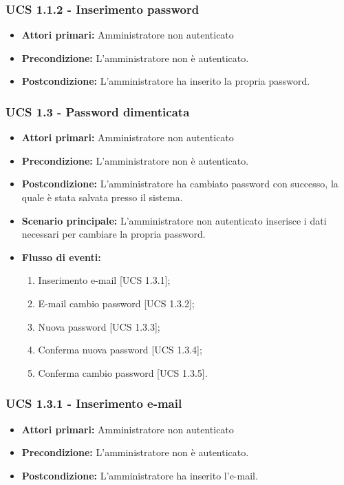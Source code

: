 \subsubsection{UCS 1.1.2 - Inserimento password}%
\begin{itemize}
\item \textbf{Attori primari:} Amministratore non autenticato
\item \textbf{Precondizione:} L'amministratore non è autenticato.
\item \textbf{Postcondizione:} L'amministratore ha inserito la propria password.
\end{itemize}

\subsubsection{UCS 1.3 - Password dimenticata}%
\begin{itemize}
\item \textbf{Attori primari:} Amministratore non autenticato
\item \textbf{Precondizione:}  L'amministratore non è autenticato.
\item \textbf{Postcondizione:} L'amministratore ha cambiato password con successo, la quale è stata salvata presso il sistema.
\item \textbf{Scenario principale:} L'amministratore non autenticato inserisce i dati necessari per cambiare la propria password.
\item \textbf{Flusso di eventi:}
    \begin{enumerate}
        \item Inserimento e-mail [UCS 1.3.1];
        \item E-mail cambio password [UCS 1.3.2];
        \item Nuova password [UCS 1.3.3];
        \item Conferma nuova password [UCS 1.3.4];
        \item Conferma cambio password [UCS 1.3.5].
    \end{enumerate}
\end{itemize}

\subsubsection{UCS 1.3.1 - Inserimento e-mail}
\begin{itemize}
\item \textbf{Attori primari:} Amministratore non autenticato
\item \textbf{Precondizione:} L'amministratore non è autenticato. %
\item \textbf{Postcondizione:} L'amministratore ha inserito l'e-mail.
\end{itemize}

